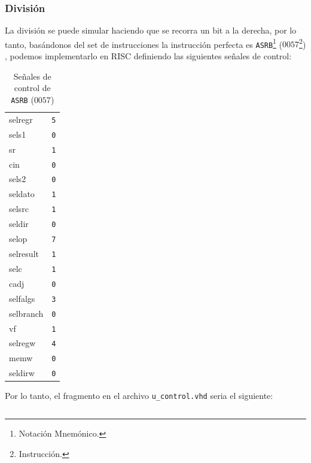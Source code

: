 \documentclass{IEEEtran}
\newenvironment{code}{\captionsetup{type=listing}}{}
\begin{document}
\subsubsection{División}
\label{sec:org116026f}
La división se puede simular haciendo que se recorra un bit a la derecha, por lo tanto, basándonos del set de instrucciones la instrucción perfecta es \texttt{ASRB}\footnote{Notación Mnemónico.} (\(0057\)\footnote{Instrucción.}) \cite[p. 24]{PM1999}, podemos implementarlo en RISC definiendo las siguientes señales de control:
\begin{table}[htbp]
\caption{Señales de control de \texttt{ASRB} (\(0057\))}
\centering
\begin{tabular}{ll}
\hline
selregr & \texttt{5}\\
sels1 & \texttt{0}\\
sr & \texttt{1}\\
cin & \texttt{0}\\
sels2 & \texttt{0}\\
seldato & \texttt{1}\\
selsrc & \texttt{1}\\
seldir & \texttt{0}\\
selop & \texttt{7}\\
selresult & \texttt{1}\\
selc & \texttt{1}\\
cadj & \texttt{0}\\
selfalgs & \texttt{3}\\
selbranch & \texttt{0}\\
vf & \texttt{1}\\
selregw & \texttt{4}\\
memw & \texttt{0}\\
seldirw & \texttt{0}\\
\hline
\end{tabular}
\end{table}
Por lo tanto, el fragmento en el archivo \texttt{u\_control.vhd} seria el siguiente:
\begin{code}
\caption{\texttt{ASRB} en \texttt{u\_control.vhd}}
\inputminted[firstline=413, lastline=431]{vhdl}{../Risc/u_control.vhd}
\end{code}
\end{document}
